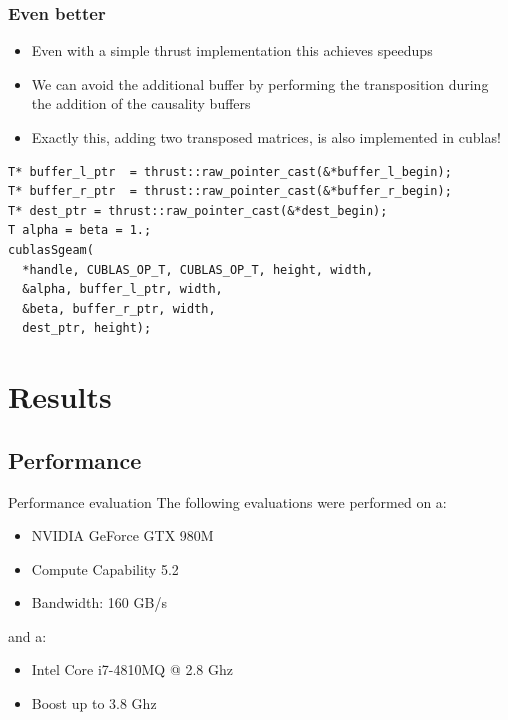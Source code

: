 \documentclass{beamer}
\begin{document}
\begin{frame}[fragile]
  \frametitle{Even better}
  \begin{itemize}
    \item Even with a simple thrust implementation this achieves speedups
    \item We can avoid the additional buffer by performing the transposition
      during the addition of the causality buffers
    \item Exactly this, adding two transposed matrices, is also implemented
      in cublas!
  \end{itemize}
  \begin{lstlisting}[basicstyle=\tiny]
T* buffer_l_ptr  = thrust::raw_pointer_cast(&*buffer_l_begin);
T* buffer_r_ptr  = thrust::raw_pointer_cast(&*buffer_r_begin);
T* dest_ptr = thrust::raw_pointer_cast(&*dest_begin);
T alpha = beta = 1.;
cublasSgeam(
  *handle, CUBLAS_OP_T, CUBLAS_OP_T, height, width,
  &alpha, buffer_l_ptr, width,
  &beta, buffer_r_ptr, width,
  dest_ptr, height);
  \end{lstlisting}
\end{frame}

\section{Results}
\subsection{Performance}
\begin{frame}{Performance evaluation}
  The following evaluations were performed on a:
  \begin{itemize}
    \item NVIDIA GeForce GTX 980M
    \item Compute Capability 5.2
    \item Bandwidth: 160 GB/s
  \end{itemize}
  and a:
  \begin{itemize}
    \item Intel Core i7-4810MQ @ 2.8 Ghz
    \item Boost up to 3.8 Ghz
  \end{itemize}
\end{frame} 
\end{document}
